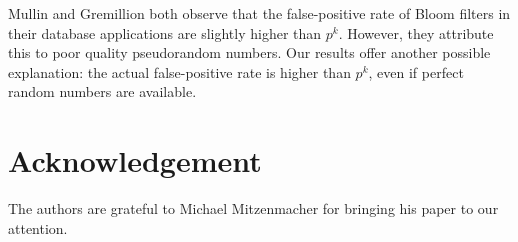 \documentclass[lotsofwhite]{patmorin}
\begin{document}
Mullin \cite{m83} and Gremillion \cite{g82} both observe that the
false-positive rate of Bloom filters in their database applications
are slightly higher than $p^k$.  However, they attribute this to poor
quality pseudorandom numbers.  Our results offer another possible
explanation: the actual  false-positive rate is higher than $p^k$,
even if perfect random numbers are available.

\section*{Acknowledgement}

The authors are grateful to Michael Mitzenmacher for bringing his
paper \cite{m02} to our attention.



\end{document}
